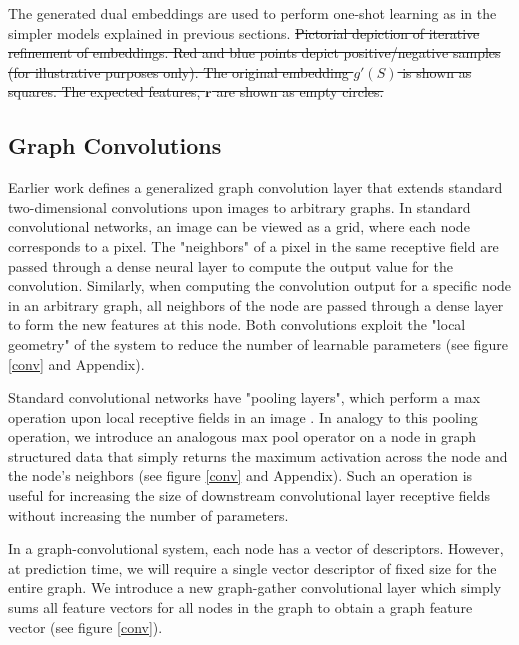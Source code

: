 \documentclass[journal=jacsat,manuscript=article]{achemso}
\providecommand{\DIFdeltex}[1]{{\protect\color{red}\sout{#1}}}                      %
\providecommand{\DIFdelbegin}{} %
\providecommand{\DIFdelend}{} %
\providecommand{\DIFdel}[1]{\texorpdfstring{\DIFdeltex{#1}}{}} %
\begin{document}
The generated dual embeddings are used to perform one-shot learning as in the simpler models explained in previous sections.
\DIFdelbegin %
{%
\DIFdel{Pictorial depiction of iterative refinement of embeddings. Red and blue points depict positive/negative samples (for illustrative purposes only). The original embedding $g'(S)$ is shown as squares. The expected features, $\mathbf{r}$ are shown as empty circles.}}
\DIFdelend 


\subsection{Graph Convolutions}
Earlier work \cite{duvenaud2015convolutional} defines a generalized graph convolution layer that extends standard two-dimensional convolutions upon images to arbitrary graphs. In standard convolutional networks, an image can be viewed as a grid, where each node corresponds to a pixel. The "neighbors" of a pixel in the same receptive field are passed through a dense neural layer to compute the output value for the convolution\cite{karpathy231n}. Similarly, when computing the convolution output for a specific node in an arbitrary graph, all neighbors of the node are passed through a dense layer to form the new features at this node. Both convolutions exploit the "local geometry" of the system to reduce the number of learnable parameters (see figure \ref{conv} and Appendix).

Standard convolutional networks have "pooling layers", which perform a max operation upon local receptive fields in an image \cite{karpathy231n}. In analogy to this pooling operation, we introduce an analogous max pool operator on a node in graph structured data that simply returns the maximum activation across the node and the node's neighbors (see figure \ref{conv} and Appendix). Such an operation is useful for increasing the size of downstream convolutional layer receptive fields without increasing the number of parameters.

In a graph-convolutional system, each node has a vector of descriptors. However, at prediction time, we will require a single vector descriptor of fixed size for the entire graph. We introduce a new graph-gather convolutional layer which simply sums all feature vectors for all nodes in the graph to obtain a graph feature vector (see figure \ref{conv}).
\end{document}
